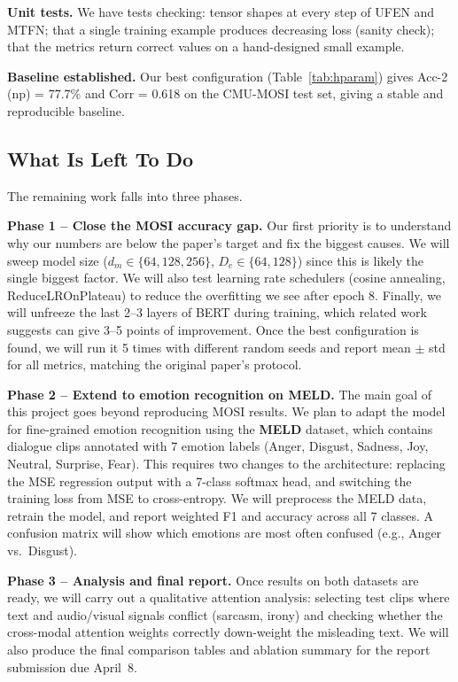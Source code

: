 \documentclass[11pt,twocolumn]{article}
\begin{document}
\textbf{Unit tests.} We have tests checking: tensor shapes at every step of UFEN and MTFN; that a single training example produces decreasing loss (sanity check); that the metrics return correct values on a hand-designed small example.

\textbf{Baseline established.} Our best configuration (Table~\ref{tab:hparam}) gives Acc-2 (np) = 77.7\% and Corr = 0.618 on the CMU-MOSI test set, giving a stable and reproducible baseline.

\subsection{What Is Left To Do}

The remaining work falls into three phases.

\textbf{Phase 1 -- Close the MOSI accuracy gap.}
Our first priority is to understand why our numbers are below the paper's target and fix the biggest causes.
We will sweep model size ($d_m \in \{64, 128, 256\}$, $D_e \in \{64, 128\}$) since this is likely the single biggest factor.
We will also test learning rate schedulers (cosine annealing, ReduceLROnPlateau) to reduce the overfitting we see after epoch 8.
Finally, we will unfreeze the last 2--3 layers of BERT during training, which related work suggests can give 3--5 points of improvement.
Once the best configuration is found, we will run it 5 times with different random seeds and report mean $\pm$ std for all metrics, matching the original paper's protocol.

\textbf{Phase 2 -- Extend to emotion recognition on MELD.}
The main goal of this project goes beyond reproducing MOSI results.
We plan to adapt the model for fine-grained emotion recognition using the \textbf{MELD} dataset, which contains dialogue clips annotated with 7 emotion labels (Anger, Disgust, Sadness, Joy, Neutral, Surprise, Fear).
This requires two changes to the architecture: replacing the MSE regression output with a 7-class softmax head, and switching the training loss from MSE to cross-entropy.
We will preprocess the MELD data, retrain the model, and report weighted F1 and accuracy across all 7 classes.
A confusion matrix will show which emotions are most often confused (e.g., Anger vs.\ Disgust).

\textbf{Phase 3 -- Analysis and final report.}
Once results on both datasets are ready, we will carry out a qualitative attention analysis: selecting test clips where text and audio/visual signals conflict (sarcasm, irony) and checking whether the cross-modal attention weights correctly down-weight the misleading text.
We will also produce the final comparison tables and ablation summary for the report submission due April~8.
\end{document}
